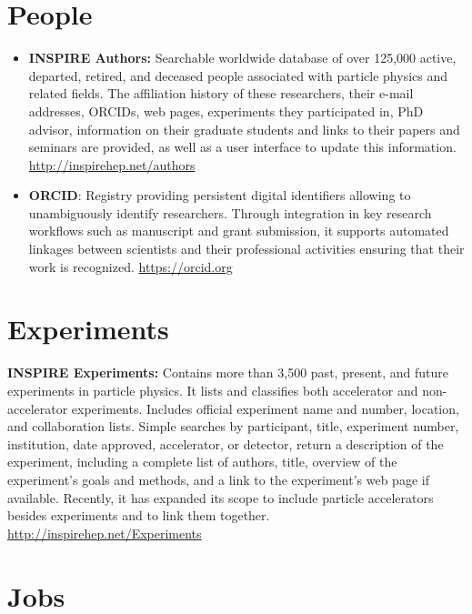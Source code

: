 \section{People}\label{databases:sec:people}

\begin{itemize}
\item
  \textbf{INSPIRE Authors:} Searchable worldwide database of over
  125,000 active, departed, retired, and deceased people associated with
  particle physics and related fields. The affiliation history of these
  researchers, their e-mail addresses, ORCIDs, web pages, experiments
  they participated in, PhD advisor, information on their graduate
  students and links to their papers and seminars are provided, as well as a user interface to update this
  information. \url{http://inspirehep.net/authors}
\item
  \textbf{ORCID}: Registry providing persistent digital identifiers
  allowing to unambiguously identify researchers. Through integration in
  key research workflows such as manuscript and grant submission, it
  supports automated linkages between scientists and their professional
  activities ensuring that their work is recognized.
  \url{https://orcid.org}
\end{itemize}

\section{Experiments}\label{databases:sec:experiments}

  \textbf{INSPIRE Experiments:} Contains more than 3,500 past, present,
  and future experiments in particle physics. It lists and classifies both accelerator and
  non-accelerator experiments. Includes official experiment name and
  number, location, and collaboration lists. Simple searches by
  participant, title, experiment number, institution, date approved,
  accelerator, or detector, return a description of the experiment,
  including a complete list of authors, title, overview of the
  experiment's goals and methods, and a link to the experiment's web
  page if available. Recently, it has expanded its scope to include
  particle accelerators besides experiments and to link them together.
  \url{http://inspirehep.net/Experiments}

\section{Jobs}\label{databases:sec:jobs}

